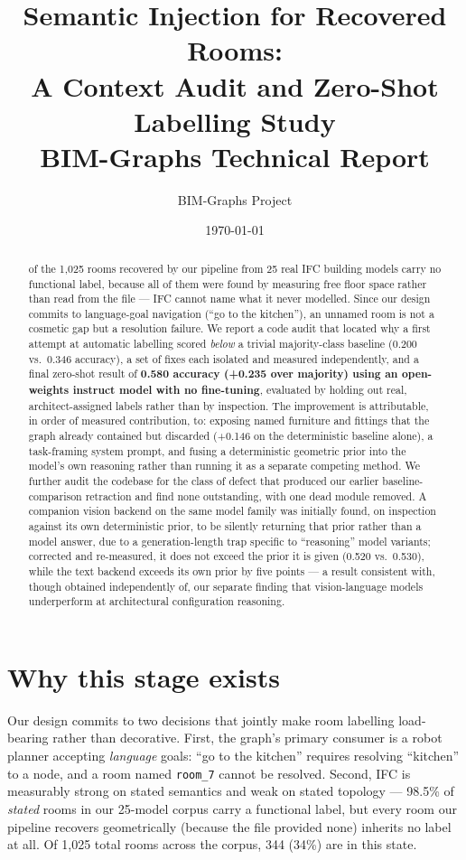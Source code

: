 \documentclass[11pt,a4paper]{article}
\title{\textbf{Semantic Injection for Recovered Rooms:\\
A Context Audit and Zero-Shot Labelling Study}\\[0.4em]
\large BIM-Graphs Technical Report}
\author{BIM-Graphs Project}
\date{\today}
\begin{document}
\maketitle

\begin{abstract}
 of the 1{,}025 rooms recovered by our pipeline from 25 real IFC building
models carry no functional label, because all of them were found by measuring
free floor space rather than read from the file --- IFC cannot name what it
never modelled. Since our design commits to language-goal navigation (``go to
the kitchen''), an unnamed room is not a cosmetic gap but a resolution failure.
We report a code audit that located why a first attempt at automatic labelling
scored \emph{below} a trivial majority-class baseline (0.200 vs.\ 0.346
accuracy), a set of fixes each isolated and measured independently, and a final
zero-shot result of \textbf{0.580 accuracy (+0.235 over majority) using an
open-weights instruct model with no fine-tuning}, evaluated by holding out real,
architect-assigned labels rather than by inspection. The improvement is
attributable, in order of measured contribution, to: exposing named furniture
and fittings that the graph already contained but discarded (+0.146 on the
deterministic baseline alone), a task-framing system prompt, and fusing a
deterministic geometric prior into the model's own reasoning rather than
running it as a separate competing method. We further audit the codebase for
the class of defect that produced our earlier baseline-comparison retraction
and find none outstanding, with one dead module removed. A companion vision
backend on the same model family was initially found, on inspection against
its own deterministic prior, to be silently returning that prior rather than a
model answer, due to a generation-length trap specific to ``reasoning'' model
variants; corrected and re-measured, it does not exceed the prior it is given
(0.520 vs.\ 0.530), while the text backend exceeds its own prior by five
points --- a result consistent with, though obtained independently of, our
separate finding that vision-language models underperform at architectural
configuration reasoning.
\end{abstract}

\section{Why this stage exists}

Our design commits to two decisions that jointly make room labelling
load-bearing rather than decorative. First, the graph's primary consumer is a
robot planner accepting \emph{language} goals: ``go to the kitchen'' requires
resolving ``kitchen'' to a node, and a room named \texttt{room\_7} cannot be
resolved. Second, IFC is measurably strong on stated semantics and weak on
stated topology --- 98.5\% of \emph{stated} rooms in our 25-model corpus carry a
functional label, but every room our pipeline recovers geometrically (because
the file provided none) inherits no label at all. Of 1{,}025 total rooms across
the corpus, 344 (34\%) are in this state.
\end{document}
